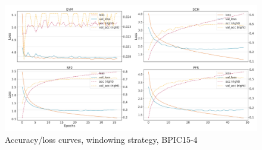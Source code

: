 \begin{figure}[!htb]
    \centering
    \includegraphics[width=\textwidth]{gfx/bpic2015_4/windowed_loss_acc_curve.pdf}
    \caption{Accuracy/loss curves, windowing strategy, BPIC15-4}
\end{figure}
\FloatBarrier

